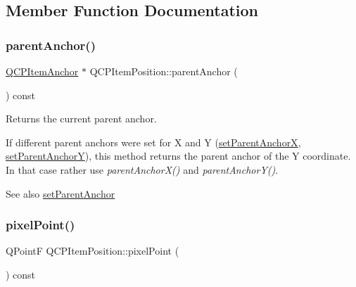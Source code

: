 \subsection{Member Function Documentation}
\mbox{\label{class_q_c_p_item_position_a0a87f9dce1af6cc9b510785991bcf1c6}} 
\subsubsection{\texorpdfstring{parent\+Anchor()}{parentAnchor()}}
{\footnotesize\ttfamily \mbox{\hyperlink{class_q_c_p_item_anchor}{Q\+C\+P\+Item\+Anchor}} $\ast$ Q\+C\+P\+Item\+Position\+::parent\+Anchor (\begin{DoxyParamCaption}{ }\end{DoxyParamCaption}) const\hspace{0.3cm}{\ttfamily [inline]}}

Returns the current parent anchor.

If different parent anchors were set for X and Y (\mbox{\hyperlink{class_q_c_p_item_position_add71461a973927c74e42179480916d9c}{set\+Parent\+AnchorX}}, \mbox{\hyperlink{class_q_c_p_item_position_add5ec1db9d19cec58a3b5c9e0a0c3f9d}{set\+Parent\+AnchorY}}), this method returns the parent anchor of the Y coordinate. In that case rather use {\itshape parent\+Anchor\+X()} and {\itshape parent\+Anchor\+Y()}.

\begin{DoxySeeAlso}{See also}
\mbox{\hyperlink{class_q_c_p_item_position_ac094d67a95d2dceafa0d50b9db3a7e51}{set\+Parent\+Anchor}} 
\end{DoxySeeAlso}
\mbox{\label{class_q_c_p_item_position_a6cad070c22801295231f5bd6045afe70}} 
\subsubsection{\texorpdfstring{pixel\+Point()}{pixelPoint()}}
{\footnotesize\ttfamily Q\+PointF Q\+C\+P\+Item\+Position\+::pixel\+Point (\begin{DoxyParamCaption}{ }\end{DoxyParamCaption}) const\hspace{0.3cm}{\ttfamily [virtual]}}

